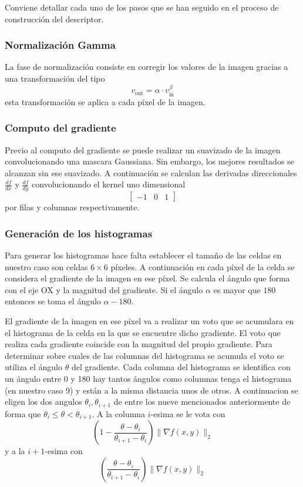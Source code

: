 \documentclass[a4paper,12pt]{article}
\begin{document}
Conviene detallar cada uno de los pasos que se han seguido en el
proceso de construcción del descriptor.

\subsubsection{Normalización Gamma}

La fase de normalización consiste en corregir los valores de la
imagen gracias a una transformación del tipo
\[
  v_{\text{out}} = \alpha \cdot v_{\text{in}}^\beta
\]
esta transformación se aplica a cada píxel de la imagen.

\subsubsection{Computo del gradiente}

Previo al computo del gradiente se puede realizar un suavizado de
la imagen convolucionando una mascara Gaussiana. Sin embargo, los mejores resultados se alcanzan sin ese suavizado.  A continuación
se calculan las derivadas direccionales $\frac{df}{dx}$ y
$\frac{df}{dy}$ convolucionando el kernel uno dimensional
\[
  \begin{bmatrix}-1 & 0 & 1\end{bmatrix}
\]
por filas y columnas respectivamente.

\subsubsection{Generación de los histogramas}

Para generar los histogramas hace falta establecer el tamaño de las
celdas en nuestro caso son celdas $6\times 6$ píxeles. A
continuación en cada píxel de la celda se considera el gradiente de
la imagen en ese píxel. Se calcula el ángulo que forma con el eje
OX y la magnitud del gradiente. Si el ángulo $\alpha$ es mayor que
$180$ entonces se toma el ángulo $\alpha - 180$.

El gradiente de la imagen en ese píxel va a realizar un voto que
se acumulara en el histograma de la celda en la que se encuentre
dicho gradiente. El voto que realiza cada gradiente coincide con
la magnitud del propio gradiente. Para determinar sobre cuales
de las columnas del histograma se acumula el voto se utiliza el
ángulo $\theta$ del gradiente. Cada columna del histograma se
identifica con un ángulo entre 0 y 180 hay tantos ángulos como
columnas tenga el histograma (en nuestro caso 9) y están a la misma
distancia unos de otros. A continuacion se eligen los dos angulos
$\theta_i,\theta_{i+1}$ de entre los nueve mencionados anteriormente
de forma que $ \theta_i \le \theta < \theta_{i+1} $. A la columna
$i$-esima se le vota con
\[
  (1-\frac{\theta-\theta_i}{\theta_{i+1} - \theta_i})\| \nabla f (x,y)\|_2
\]
y a la $i+1$-esima con 
\[
  (\frac{\theta-\theta_i}{\theta_{i+1} - \theta_i})\| \nabla f (x,y)\|_2
\]
  
\end{document}
